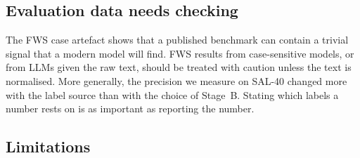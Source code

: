 \subsection{Evaluation data needs checking}

The FWS case artefact shows that a published benchmark can contain a trivial signal that a modern model will find. FWS results from case-sensitive models, or from LLMs given the raw text, should be treated with caution unless the text is normalised. More generally, the precision we measure on SAL-40 changed more with the label source than with the choice of Stage~B. Stating which labels a number rests on is as important as reporting the number.

\subsection{Limitations}

